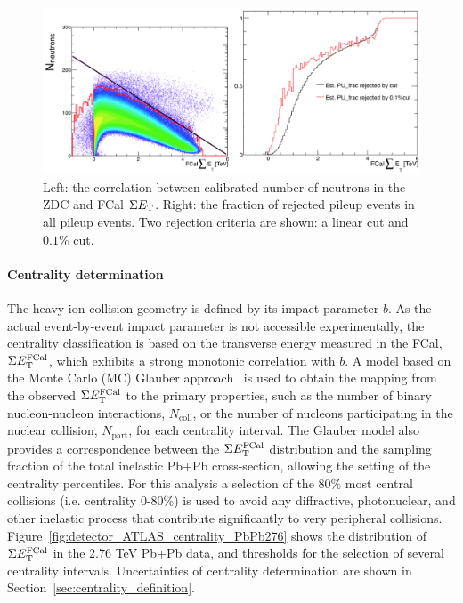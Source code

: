 \begin{figure}[H]
\centering
\includegraphics[width=.95\linewidth]{figs/chapter_detector/ATLAS_pileup_PbPb502.png}
\caption{Left: the correlation between calibrated number of neutrons in the ZDC and FCal $\Sigma E_\text{T}$. Right: the fraction of rejected pileup events in all pileup events. Two rejection criteria are shown: a linear cut and $0.1\%$ cut.}
\label{fig:detector_ATLAS_pileup_PbPb502}
\end{figure}



\paragraph{Centrality determination}
\label{sec:centrality_determination}

The heavy-ion collision geometry is defined by its impact parameter $b$. As the actual event-by-event impact parameter is not accessible experimentally, the centrality classification is based on the transverse energy measured in the FCal, $\Sigma E_\text{T}^\text{FCal}$, which exhibits a strong monotonic correlation with $b$. A model based on the Monte Carlo (MC) Glauber approach~\cite{Miller:2007ri} is used to obtain the mapping from the observed $\Sigma E_\text{T}^\text{FCal}$ to the primary properties, such as the number of binary nucleon-nucleon interactions, $N_\text{coll}$, or the number of nucleons participating in the nuclear collision, $N_\text{part}$, for each centrality interval. The Glauber model also provides a correspondence between the $\Sigma E_\text{T}^\text{FCal}$ distribution and the sampling fraction of the total inelastic Pb+Pb cross-section, allowing the setting of the centrality percentiles. For this analysis a selection of the $80\%$ most central collisions (i.e. centrality 0-80$\%$) is used to avoid any diffractive, photonuclear, and other inelastic process that contribute significantly to very peripheral collisions. Figure~\ref{fig:detector_ATLAS_centrality_PbPb276} shows the distribution of $\Sigma E_\text{T}^\text{FCal}$ in the 2.76 TeV Pb+Pb data, and thresholds for the selection of several centrality intervals. Uncertainties of centrality determination are shown in Section~\ref{sec:centrality_definition}.

